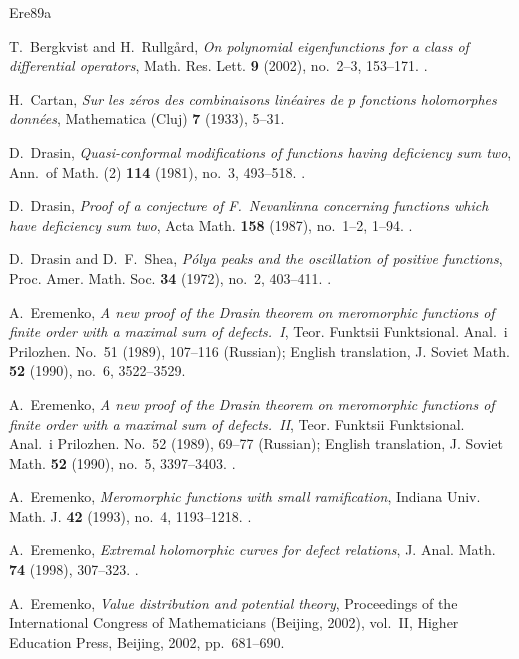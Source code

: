 \documentclass[12pt,letterpaper,reqno]{amsart}
\theoremstyle{definition}
\numberwithin{equation}{section}
\begin{document}
\renewcommand{\bibliofont}{\fontsize{10}{11}\selectfont}
\begin{thebibliography}{Ere89a}
\raggedright

T.~Bergkvist and H.~Rullg\aa rd,
\emph{On polynomial eigenfunctions for a class of differential operators},
Math. Res. Lett. \textbf{9} (2002), no.~2--3, 153--171.
.

H.~Cartan,
\emph{Sur les z\'eros des combinaisons lin\'eaires de $p$ fonctions
holomorphes donn\'ees},
Mathematica (Cluj) \textbf{7} (1933), 5--31.

D.~Drasin,
\emph{Quasi-conformal modifications of functions having deficiency sum two},
Ann.\ of Math. (2) \textbf{114} (1981), no.~3, 493--518.
.

D.~Drasin,
\emph{Proof of a conjecture of F.~Nevanlinna concerning functions which
have deficiency sum two},
Acta Math. \textbf{158} (1987), no.~1--2, 1--94.
.

D.~Drasin and D.~F.~Shea,
\emph{P\'olya peaks and the oscillation of positive functions},
Proc. Amer. Math. Soc. \textbf{34} (1972), no.~2, 403--411.
.

A.~Eremenko,
\emph{A new proof of the Drasin theorem on meromorphic functions of finite
order with a maximal sum of defects.~I},
Teor. Funktsii Funktsional. Anal.\ i Prilozhen. No.~51 (1989), 107--116
(Russian); English translation, J. Soviet Math. \textbf{52} (1990),
no.~6, 3522--3529.

A.~Eremenko,
\emph{A new proof of the Drasin theorem on meromorphic functions of finite
order with a maximal sum of defects.~II},
Teor. Funktsii Funktsional. Anal.\ i Prilozhen. No.~52 (1989), 69--77
(Russian); English translation, J. Soviet Math. \textbf{52} (1990),
no.~5, 3397--3403.
.

A.~Eremenko,
\emph{Meromorphic functions with small ramification},
Indiana Univ. Math. J. \textbf{42} (1993), no.~4, 1193--1218.
.

A.~Eremenko,
\emph{Extremal holomorphic curves for defect relations},
J. Anal. Math. \textbf{74} (1998), 307--323.
.

A.~Eremenko,
\emph{Value distribution and potential theory},
Proceedings of the International Congress of Mathematicians
(Beijing, 2002), vol.~II, Higher Education Press, Beijing, 2002,
pp.~681--690.


\end{thebibliography}
\end{document}

